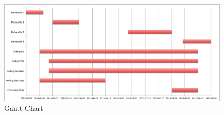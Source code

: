 \documentclass{article}
\begin{document}
\begin{figure}[!htb]
\caption{Gantt Chart}
\centering
\includegraphics[scale=0.55]{charts/GanttChart.png}
\end{figure}


\clearpage
\end{document}
